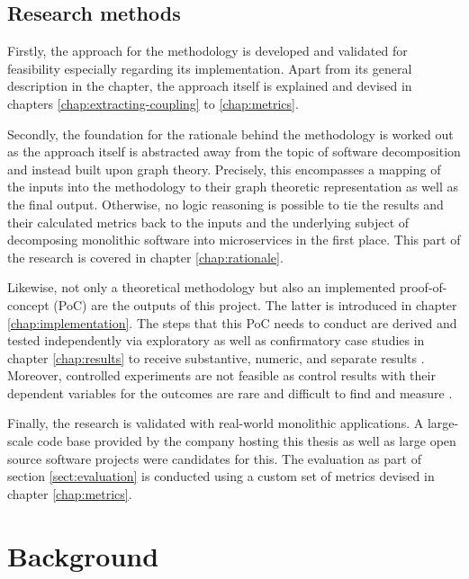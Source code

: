 \documentclass[12pt,a4paper]{report}
\begin{document}
\section{Research methods}

Firstly, the approach for the methodology is developed and validated
for feasibility especially regarding its implementation.
Apart from its general description in the \textit{} chapter,
the approach itself is explained and devised in chapters
\ref{chap:extracting-coupling} to \ref{chap:metrics}.

Secondly, the foundation for the rationale behind the methodology is worked out
as the approach itself is abstracted away from the topic of
software decomposition and instead built upon graph theory.
Precisely, this encompasses a mapping of the inputs into the methodology to
their graph theoretic representation as well as the final output.
Otherwise, no logic reasoning is possible to tie the results and
their calculated metrics back to the inputs and the underlying subject
of decomposing monolithic software into microservices in the first place.
This part of the research is covered in chapter \ref{chap:rationale}.

Likewise, not only a theoretical methodology but also an implemented
proof-of-concept (PoC) are the outputs of this project.
The latter is introduced in chapter \ref{chap:implementation}.
The steps that this PoC needs to conduct are derived and tested
independently via exploratory as well as confirmatory case studies
in chapter \ref{chap:results} to receive substantive, numeric,
and separate results \cite{easterbrook2008selecting}.
Moreover, controlled experiments are not feasible as control results
with their dependent variables for the outcomes are rare and difficult
to find and measure \cite{easterbrook2008selecting}.

Finally, the research is validated with real-world monolithic applications.
A large-scale code base provided by the company hosting this thesis as well as
large open source software projects were candidates for this.
The evaluation as part of section \ref{sect:evaluation} is conducted using
a custom set of metrics devised in chapter \ref{chap:metrics}.




\chapter{Background} \label{chap:background}
\end{document}
